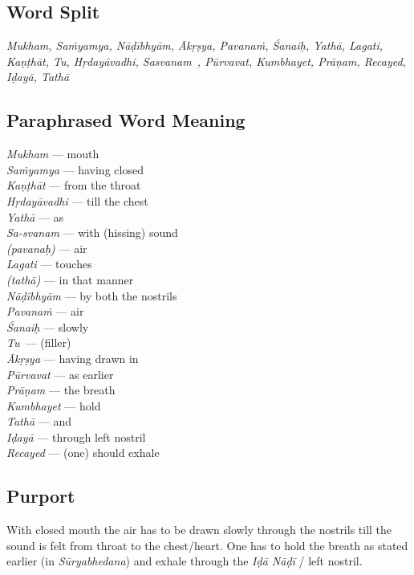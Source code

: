\subsection*{Word Split}

\textit{Mukham, Saṁyamya, Nāḍībhyām, Ākṛṣya, Pavanaṁ, Śanaiḥ, Yathā, Lagati, Kaṇṭhāt, Tu, Hṛdayāvadhi, Sasvanam , Pūrvavat, Kumbhayet, Prāṇam, Recayed, Iḍayā, Tathā}

\subsection*{Paraphrased Word Meaning}

\begin{multicols}{2}
\textit{Mukham} --- mouth\\
\textit{Saṁyamya} --- having closed\\
\textit{Kaṇṭhāt} --- from the throat\\
\textit{Hṛdayāvadhi} --- till the chest\\
\textit{Yathā} --- as\\
\textit{Sa-svanam} --- with (hissing) sound\\
\textit{(pavanaḥ)} --- air\\
\textit{Lagati} --- touches\\
\textit{(tathā)} --- in that manner\\
\textit{Nāḍībhyām} --- by both the nostrils\\
\textit{Pavanaṁ} --- air\\
\textit{Śanaiḥ} --- slowly\\
\textit{Tu }--- (filler)\\
\textit{Ākṛṣya} --- having drawn in \\
\textit{Pūrvavat} --- as earlier \\
\textit{Prāṇam} --- the breath \\
\textit{Kumbhayet} --- hold \\
\textit{Tathā} --- and \\
\textit{Iḍayā} --- through left nostril\\
\textit{Recayed} --- (one) should exhale
\end{multicols}

\subsection*{Purport}

With closed mouth the air has to be drawn slowly through the nostrils till the sound is felt from throat to the chest/heart. One has to hold the breath as stated earlier (in \textit{Sūryabhedana}) and exhale through the \textit{Iḍā Nāḍī} / left nostril.    
\newpage

